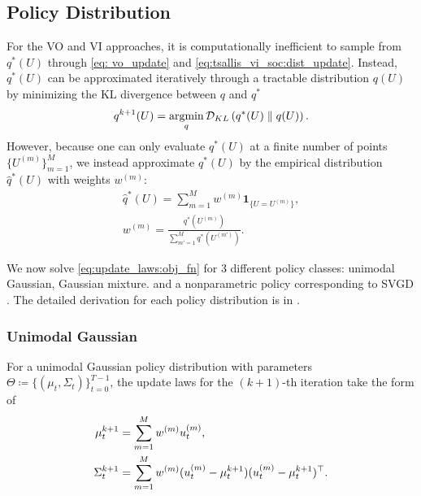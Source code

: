 \documentclass[twoside,11pt]{article}
\begin{document}
\subsection{Policy Distribution}
\label{sec: policy}
For the \ac{VO} and \ac{VI} approaches, it is computationally inefficient to sample from $q^*(U)$ through \eqref{eq: vo_update} and \eqref{eq:tsallis_vi_soc:dist_update}. Instead, $q^*(U)$ can be approximated iteratively through a tractable distribution $q(U)$ by minimizing the KL divergence between $q$ and $q^*$
\begin{equation} \label{eq:update_laws:obj_fn}
q^{k+1}(U) = \argmin_{q} \KL{q^*(U)}{q(U)} .
\end{equation}
However, because one can only evaluate $q^*(U)$ at a finite number of points $\{ U^{(m)} \}_{m=1}^M$, we instead approximate $q^*(U)$ by the empirical distribution $\hat{q}^*(U)$ with weights $w^{(m)}$:
\begin{align}
    \hat{q}^*(U) = \sum_{m=1}^M w^{(m)} \bm{1}_{\{U = U^{(m)} \}}, \\
    w^{(m)} = \frac{q^*(U^{(m)})}{\sum_{m'=1}^M q^*(U^{(m')}) } .
\end{align}

We now solve \cref{eq:update_laws:obj_fn} for 3 different policy classes: unimodal Gaussian, Gaussian mixture. and a nonparametric policy corresponding to \ac{SVGD} \citep{lambert2020stein, liu2016stein}. The detailed derivation for each policy distribution is in .

\subsubsection{Unimodal Gaussian} For a unimodal Gaussian policy distribution with parameters $\Theta\coloneqq\{ (\mu_t, \Sigma_t) \}_{t=0}^{T-1}$, the update laws for the $(k+1)$-th iteration take the form of
\begin{subequations}
\begin{align} 
\mu^{k+1}_t &=
    \sum_{m=1}^M w^{(m)} u_t^{(m)}, \label{eq:mean_update} \\
\Sigma^{k+1}_t &=
    \sum_{m=1}^M w^{(m)} (u_t^{(m)}-\mu_t^{k+1})(u_t^{(m)}-\mu_t^{k+1})^\top \label{eq:var_update} .
\end{align}
\end{subequations}
\end{document}
